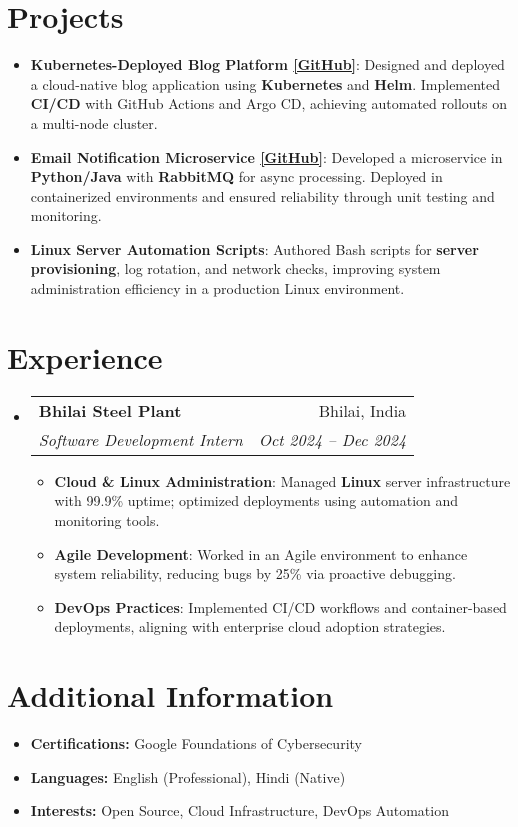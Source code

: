 \documentclass[letterpaper,10pt]{article}
\makeatletter
\newcommand{\resumeItem}[2]{\item \small{\textbf{#1}: #2}}
\newcommand{\resumeSubheading}[4]{
  \item
    \begin{tabular*}{0.97\textwidth}{l@{\extracolsep{\fill}}r}
      \textbf{#1} & #2 \\
      \textit{\small #3} & \textit{\small #4} \\
    \end{tabular*}\vspace{-3pt}
}
\newcommand{\resumeSubHeadingListStart}{\begin{itemize}[leftmargin=*]}
\newcommand{\resumeSubHeadingListEnd}{\end{itemize}}
\newcommand{\resumeItemListStart}{\begin{itemize}[leftmargin=*]}
\newcommand{\resumeItemListEnd}{\end{itemize}\vspace{-4pt}}
\makeatother
\begin{document}
\section{Projects}
\resumeSubHeadingListStart
  \resumeItem{Kubernetes-Deployed Blog Platform \href{https://github.com/Anurag-xo/Blog-web}{[GitHub]}}
    {Designed and deployed a cloud-native blog application using \textbf{Kubernetes} and \textbf{Helm}. Implemented \textbf{CI/CD} with GitHub Actions and Argo CD, achieving automated rollouts on a multi-node cluster.}
  \resumeItem{Email Notification Microservice \href{https://github.com/Anurag-xo/EmailNotification-microservice}{[GitHub]}}
    {Developed a microservice in \textbf{Python/Java} with \textbf{RabbitMQ} for async processing. Deployed in containerized environments and ensured reliability through unit testing and monitoring.}
  \resumeItem{Linux Server Automation Scripts}
    {Authored Bash scripts for \textbf{server provisioning}, log rotation, and network checks, improving system administration efficiency in a production Linux environment.}
\resumeSubHeadingListEnd

\section{Experience}
\resumeSubHeadingListStart
  \resumeSubheading
    {Bhilai Steel Plant}{Bhilai, India}
    {Software Development Intern}{Oct 2024 – Dec 2024}
  \resumeItemListStart
    \resumeItem{Cloud \& Linux Administration}{Managed \textbf{Linux} server infrastructure with 99.9\% uptime; optimized deployments using automation and monitoring tools.}
    \resumeItem{Agile Development}{Worked in an Agile environment to enhance system reliability, reducing bugs by 25\% via proactive debugging.}
    \resumeItem{DevOps Practices}{Implemented CI/CD workflows and container-based deployments, aligning with enterprise cloud adoption strategies.}
  \resumeItemListEnd
\resumeSubHeadingListEnd

\section{Additional Information}
\resumeSubHeadingListStart
  \item[] \textbf{Certifications:} Google Foundations of Cybersecurity
  \item[] \textbf{Languages:} English (Professional), Hindi (Native)
  \item[] \textbf{Interests:} Open Source, Cloud Infrastructure, DevOps Automation
\resumeSubHeadingListEnd
\end{document}
